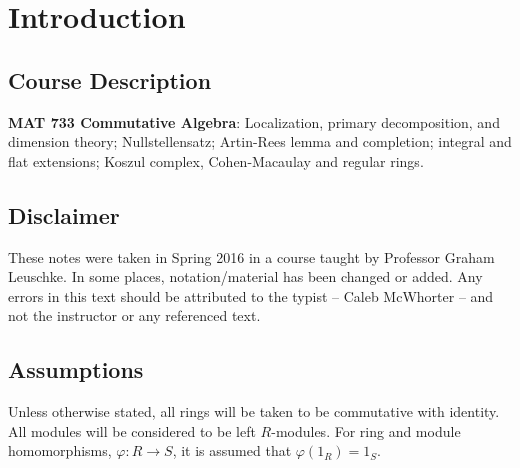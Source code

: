 \newpage
\section{Introduction}

\subsection{Course Description}

\textbf{MAT 733 Commutative Algebra}: Localization, primary decomposition, and dimension theory; Nullstellensatz; Artin-Rees lemma and completion; integral and flat extensions; Koszul complex, Cohen-Macaulay and regular rings.

\subsection{Disclaimer}

These notes were taken in Spring 2016 in a course taught by Professor Graham Leuschke. In some places, notation/material has been changed or added. Any errors in this text should be attributed to the typist -- Caleb McWhorter -- and not the instructor or any referenced text. 

\subsection{Assumptions}

Unless otherwise stated, all rings will be taken to be commutative with identity. All modules will be considered to be left $R$-modules. For ring and module homomorphisms, $\varphi: R \rightarrow S$, it is assumed that $\varphi(1_R)=1_S$. 